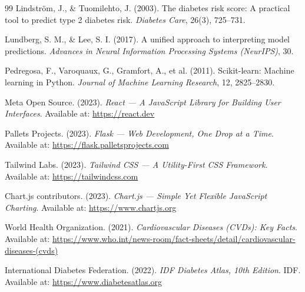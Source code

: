 \documentclass[12pt,a4paper]{report}
\begin{document}
\begin{thebibliography}{99}
Lindstr{\"o}m, J., \& Tuomilehto, J. (2003). The diabetes risk score: A practical tool to predict type 2 diabetes risk. \textit{Diabetes Care}, 26(3), 725--731.

Lundberg, S. M., \& Lee, S. I. (2017). A unified approach to interpreting model predictions. \textit{Advances in Neural Information Processing Systems (NeurIPS)}, 30.

Pedregosa, F., Varoquaux, G., Gramfort, A., et al. (2011). Scikit-learn: Machine learning in Python. \textit{Journal of Machine Learning Research}, 12, 2825--2830.

Meta Open Source. (2023). \textit{React — A JavaScript Library for Building User Interfaces}. Available at: \url{https://react.dev}

Pallets Projects. (2023). \textit{Flask — Web Development, One Drop at a Time}. Available at: \url{https://flask.palletsprojects.com}

Tailwind Labs. (2023). \textit{Tailwind CSS — A Utility-First CSS Framework}. Available at: \url{https://tailwindcss.com}

Chart.js contributors. (2023). \textit{Chart.js — Simple Yet Flexible JavaScript Charting}. Available at: \url{https://www.chartjs.org}

World Health Organization. (2021). \textit{Cardiovascular Diseases (CVDs): Key Facts}. Available at: \url{https://www.who.int/news-room/fact-sheets/detail/cardiovascular-diseases-(cvds)}

International Diabetes Federation. (2022). \textit{IDF Diabetes Atlas, 10th Edition}. IDF. Available at: \url{https://www.diabetesatlas.org}

\end{thebibliography}
\end{document}

